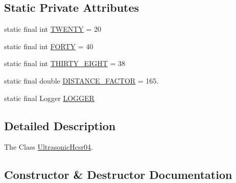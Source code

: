 \subsection*{Static Private Attributes}
\begin{DoxyCompactItemize}
\item 
static final int \hyperlink{classcom_1_1libsensorj_1_1concretesensor_1_1UltrasonicHcsr04_aa04a319fc4ef2ccf8de8a70bf27da2da}{T\+W\+E\+N\+T\+Y} = 20
\item 
static final int \hyperlink{classcom_1_1libsensorj_1_1concretesensor_1_1UltrasonicHcsr04_a7106eaa9f89d876a4749d502232964df}{F\+O\+R\+T\+Y} = 40
\item 
static final int \hyperlink{classcom_1_1libsensorj_1_1concretesensor_1_1UltrasonicHcsr04_a25452283296d3780a7fefbfa20e40a93}{T\+H\+I\+R\+T\+Y\+\_\+\+E\+I\+G\+H\+T} = 38
\item 
static final double \hyperlink{classcom_1_1libsensorj_1_1concretesensor_1_1UltrasonicHcsr04_a0483c4e470b1ab9e1a437fbeec6595e9}{D\+I\+S\+T\+A\+N\+C\+E\+\_\+\+F\+A\+C\+T\+O\+R} = 165.
\item 
static final Logger \hyperlink{classcom_1_1libsensorj_1_1concretesensor_1_1UltrasonicHcsr04_a9a3534d952f2668b69b0888b9e929abb}{L\+O\+G\+G\+E\+R}
\end{DoxyCompactItemize}


\subsection{Detailed Description}
The Class \hyperlink{classcom_1_1libsensorj_1_1concretesensor_1_1UltrasonicHcsr04}{Ultrasonic\+Hcsr04}. 

\subsection{Constructor \& Destructor Documentation}
\hypertarget{classcom_1_1libsensorj_1_1concretesensor_1_1UltrasonicHcsr04_a7e02068d9acb1b3cf1d15d45afbf377b}{}
